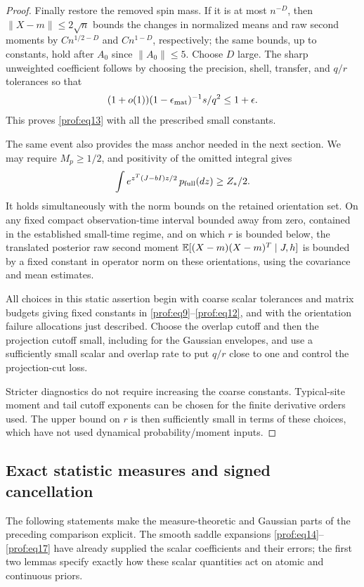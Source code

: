 \begin{proof}
Finally restore the removed spin mass. If it is at most \(n^{-D}\),
then \(\|X-m\|\le2\sqrt n\) bounds the changes in normalized means
and raw second moments by \(Cn^{1/2-D}\) and \(Cn^{1-D}\),
respectively; the same bounds, up to constants, hold after \(A_0\)
since \(\|A_0\|\le5\). Choose \(D\) large. The sharp unweighted
coefficient follows by choosing the precision, shell, transfer, and
\(q/r\) tolerances so that
\[
 (1+o(1))(1-\epsilon_{\rm mat})^{-1}s/q^2\le1+\epsilon.
\]
This proves \eqref{prof:eq13} with all the prescribed small
constants.

The same event also provides the mass anchor needed in the next
section. We may require \(M_p\ge1/2\), and positivity of the omitted
integral gives
\begin{equation}\label{prof:mass-anchor}
 \int e^{z^T(J-bI)z/2}\,p_{\rm full}(dz)\ge Z_*/2.
\end{equation}
It holds simultaneously with the norm bounds on the retained
orientation set. On any fixed compact observation-time interval
bounded away from zero, contained in the established small-time regime,
and on which \(r\) is bounded below, the translated posterior raw
second moment \(\mathbb E[(X-m)(X-m)^T\mid J,h]\) is bounded by a fixed
constant in operator norm on these orientations, using the covariance
and mean estimates.

All choices in this static assertion begin with coarse scalar
tolerances and matrix budgets giving fixed constants in
\eqref{prof:eq9}--\eqref{prof:eq12}, and with the orientation
failure allocations just described. Choose the overlap cutoff and
then the projection cutoff small, including for the Gaussian
envelopes, and use a sufficiently small scalar and overlap rate to
put \(q/r\) close to one and control the projection-cut loss.

Stricter diagnostics do not require increasing the coarse constants. Typical-site moment and tail cutoff exponents can be chosen for the finite derivative orders used. The upper bound on \(r\) is then sufficiently small in terms of these choices, which have not used dynamical probability/moment inputs.

\end{proof}

\subsection{Exact statistic measures and signed cancellation}

The following statements make the measure-theoretic and Gaussian parts
of the preceding comparison explicit. The smooth saddle expansions
\eqref{prof:eq14}--\eqref{prof:eq17} have already supplied the scalar
coefficients and their errors; the first two lemmas specify exactly how
these scalar quantities act on atomic and continuous priors.

